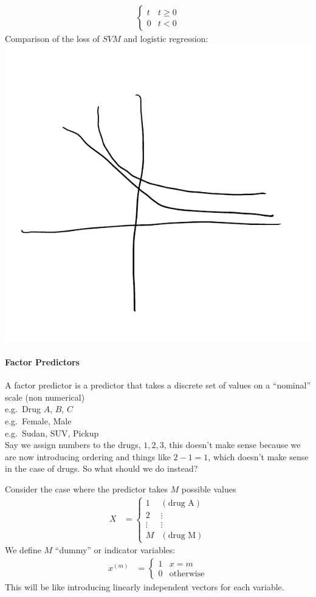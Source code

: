 \documentclass[12 pt]{article}
\begin{document}
\begin{enumerate}
\begin{align*}
\begin{cases}
                     t & t \geq 0
                     \\ 0 & t < 0
                   \end{cases}
    \end{align*}
    Comparison of the loss of $SVM$ and logistic regression:\\
    \includegraphics[width=.4\textwidth]{38.pdf}
  \end{enumerate}
  \paragraph{Factor Predictors}
  A factor predictor is a predictor that takes a discrete set of
  values on a ``nominal'' scale (non numerical)
  \\ e.g.\ Drug $A$, $B$, $C$
  \\ e.g.\ Female, Male
  \\ e.g.\ Sudan, SUV, Pickup
  \\ Say we assign numbers to the drugs, $1,2,3$, this doesn't make
  sense because we are now introducing ordering and things like $2 - 1
  = 1$, which doesn't make sense in the case of drugs. So what should
  we do instead?

  Consider the case where the predictor takes $M$ possible values
  \begin{align*}
    X & =
        \begin{cases}
          1 & (\text{drug A})\\2 & \vdots\\\vdots & \vdots\\M &
          (\text{drug M})
        \end{cases}
  \end{align*}
  We define $M$ ``dummy'' or indicator variables:
  \begin{align*}
    x^{(m)} & =
          \begin{cases}
            1 & x = m
            \\0 & \text{otherwise}
          \end{cases}
  \end{align*}
  This will be like introducing linearly independent vectors for each
  variable.
\end{document}
